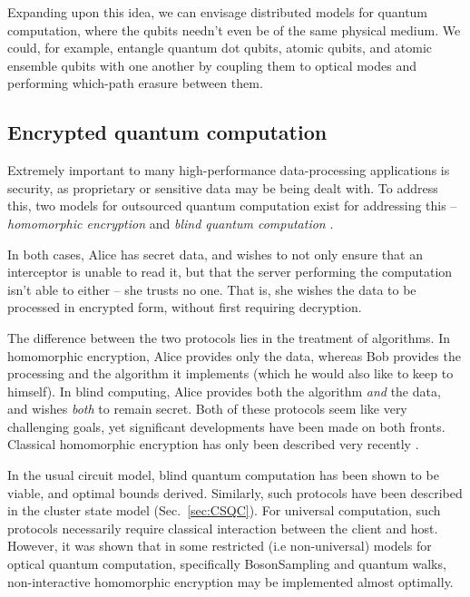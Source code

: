 \documentclass[aps,rmp,twocolumn,amsmath,amssymb,nofootinbib,superscriptaddress]{revtex4}
\newcommand{\comment}[1]{{\color{blue}{\textbf{#1}}}}
\begin{document}
Expanding upon this idea, we can envisage distributed models for quantum computation, where the qubits needn't even be of the same physical medium. We could, for example, entangle quantum dot qubits, atomic qubits, and atomic ensemble qubits with one another by coupling them to optical modes and performing which-path erasure between them.

%
%

\subsection{Encrypted quantum computation} \label{sec:homo_blind}

Extremely important to many high-performance data-processing applications is security, as proprietary or sensitive data may be being dealt with. To address this, two models for outsourced quantum computation exist for addressing this -- \emph{homomorphic encryption} \cite{???, gentry2009fully, van2010fully} and \emph{blind quantum computation} \cite{???, bib:blind2, bib:blind3, bib:blind1, PhysRevLett.108.200502, bib:Morimae3486, bib:Morimae5460, bib:Morimae3966}.

In both cases, Alice has secret data, and wishes to not only ensure that an interceptor is unable to read it, but that the server performing the computation isn't able to either -- she trusts no one. That is, she wishes the data to be processed in encrypted form, without first requiring decryption.

The difference between the two protocols lies in the treatment of algorithms. In homomorphic encryption, Alice provides only the data, whereas Bob provides the processing and the algorithm it implements (which he would also like to keep to himself). In blind computing, Alice provides both the algorithm \emph{and} the data, and wishes \emph{both} to remain secret. Both of these protocols seem like very challenging goals, yet significant developments have been made on both fronts. Classical homomorphic encryption has only been described very recently \cite{bib:gentry2009fully, bib:van2010fully}. \comment{What about classical blind computation?}

In the usual circuit model, blind quantum computation has been shown to be viable, and optimal bounds derived. Similarly, such protocols have been described \cite{homoCS} in the cluster state model (Sec.~\ref{sec:CSQC}). For universal computation, such protocols necessarily require classical interaction between the client and host. However, it was shown that in some restricted (i.e non-universal) models for optical quantum computation, specifically {\sc BosonSampling} and quantum walks, non-interactive homomorphic encryption may be implemented almost optimally.
\end{document}
